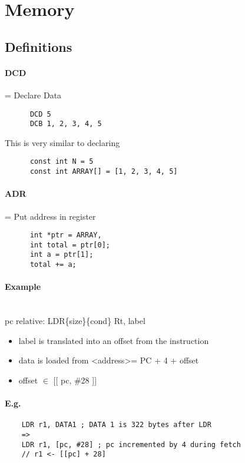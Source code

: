 \section{Memory}
  \subsection{Definitions}
    \paragraph{DCD} = Declare Data
    \begin{lstlisting}
      DCD 5
      DCB 1, 2, 3, 4, 5
    \end{lstlisting}
    This is very similar to declaring
    \begin{lstlisting}
      const int N = 5
      const int ARRAY[] = [1, 2, 3, 4, 5]
    \end{lstlisting}

    \paragraph{ADR} = Put address in register
    \begin{lstlisting}
      int *ptr = ARRAY,
      int total = ptr[0];
      int a = ptr[1];
      total += a;
    \end{lstlisting}

  \paragraph{Example} ~\\
    pc relative: LDR\{size\}\{cond\} Rt, label
    \begin{itemize}
      \item label is translated into an offset from the instruction
      \item data is loaded from \textless address\textgreater = PC + 4 + offset
      \item offset $\in$ [[ pc, \#28 ]]
    \end{itemize}

  \paragraph{E.g.}
  \begin{lstlisting}
    LDR r1, DATA1 ; DATA 1 is 322 bytes after LDR
    =>
    LDR r1, [pc, #28] ; pc incremented by 4 during fetch
    // r1 <- [[pc] + 28]
  \end{lstlisting}

